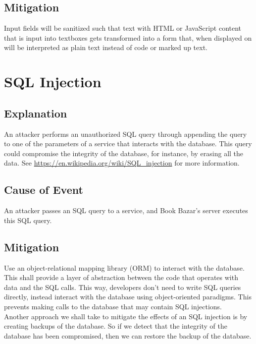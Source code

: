 \documentclass[fullpage]{article}
\begin{document}
\subsection*{Mitigation}
Input fields will be sanitized such that text with HTML or JavaScript content that is input into textboxes gets transformed into a form that, when displayed on will be interpreted as plain text instead of code or marked up text.

\section{SQL Injection}

\subsection*{Explanation}
An attacker performs an unauthorized SQL query through appending the query to one of the parameters of a service that interacts with the database. This query could compromise the integrity of the database, for instance, by erasing all the data. See \url{https://en.wikipedia.org/wiki/SQL_injection} for more information.

\subsection*{Cause of Event}
An attacker passes an SQL query to a service, and Book Bazar’s server executes this SQL query.

\subsection*{Mitigation}
Use an object-relational mapping library (ORM) to interact with the database. This shall provide a layer of abstraction between the code that operates with data and the SQL calls. This way, developers don’t need to write SQL queries directly, instead interact with the database using object-oriented paradigms. This prevents making calls to the database that may contain SQL injections.\\
\newline
Another approach we shall take to mitigate the effects of an SQL injection is by creating backups of the database. So if we detect that the integrity of the database has been compromised, then we can restore the backup of the database.
\begin{comment}
\begin{thebibliography}{9}

\bibitem{website}
S. Liu, “Canada most popular desktop browsers 2021,” Statista, 04-Oct-2021. [Online]. Available: https://www.statista.com/statistics/499462/most-popular-desktop-browsers-in-canada-by-market-share/. [Accessed: 17-Oct-2021]. 

\end{thebibliography}
\end{comment}
\end{document}
